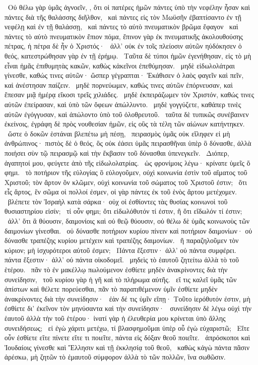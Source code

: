 ~Οὐ θέλω γὰρ ὑμᾶς ἀγνοεῖν, , ὅτι οἱ πατέρες ἡμῶν πάντες ὑπὸ τὴν νεφέλην ἦσαν καὶ πάντες διὰ τῆς θαλάσσης διῆλθον,
~καὶ πάντες εἰς τὸν Μωϋσῆν ἐβαπτίσαντο ἐν τῇ νεφέλῃ καὶ ἐν τῇ θαλάσσῃ,
~καὶ πάντες τὸ αὐτὸ πνευματικὸν βρῶμα ἔφαγον
~καὶ πάντες τὸ αὐτὸ πνευματικὸν ἔπιον πόμα, ἔπινον γὰρ ἐκ πνευματικῆς ἀκολουθούσης πέτρας, ἡ πέτρα δὲ ἦν ὁ Χριστός·
~ἀλλ’ οὐκ ἐν τοῖς πλείοσιν αὐτῶν ηὐδόκησεν ὁ θεός, κατεστρώθησαν γὰρ ἐν τῇ ἐρήμῳ.
~Ταῦτα δὲ τύποι ἡμῶν ἐγενήθησαν, εἰς τὸ μὴ εἶναι ἡμᾶς ἐπιθυμητὰς κακῶν, καθὼς κἀκεῖνοι ἐπεθύμησαν.
~μηδὲ εἰδωλολάτραι γίνεσθε, καθώς τινες αὐτῶν· ὥσπερ γέγραπται· Ἐκάθισεν ὁ λαὸς φαγεῖν καὶ πεῖν, καὶ ἀνέστησαν παίζειν.
~μηδὲ πορνεύωμεν, καθώς τινες αὐτῶν ἐπόρνευσαν, καὶ ἔπεσαν μιᾷ ἡμέρᾳ εἴκοσι τρεῖς χιλιάδες.
~μηδὲ ἐκπειράζωμεν τὸν Χριστόν, καθώς τινες αὐτῶν ἐπείρασαν, καὶ ὑπὸ τῶν ὄφεων ἀπώλλυντο.
~μηδὲ γογγύζετε, καθάπερ τινὲς αὐτῶν ἐγόγγυσαν, καὶ ἀπώλοντο ὑπὸ τοῦ ὀλοθρευτοῦ.
~ταῦτα δὲ τυπικῶς συνέβαινεν ἐκείνοις, ἐγράφη δὲ πρὸς νουθεσίαν ἡμῶν, εἰς οὓς τὰ τέλη τῶν αἰώνων κατήντηκεν.
~ὥστε ὁ δοκῶν ἑστάναι βλεπέτω μὴ πέσῃ,
~πειρασμὸς ὑμᾶς οὐκ εἴληφεν εἰ μὴ ἀνθρώπινος· πιστὸς δὲ ὁ θεός, ὃς οὐκ ἐάσει ὑμᾶς πειρασθῆναι ὑπὲρ ὃ δύνασθε, ἀλλὰ ποιήσει σὺν τῷ πειρασμῷ καὶ τὴν ἔκβασιν τοῦ δύνασθαι ὑπενεγκεῖν.
~Διόπερ, ἀγαπητοί μου, φεύγετε ἀπὸ τῆς εἰδωλολατρίας.
~ὡς φρονίμοις λέγω· κρίνατε ὑμεῖς ὅ φημι.
~τὸ ποτήριον τῆς εὐλογίας ὃ εὐλογοῦμεν, οὐχὶ κοινωνία ἐστὶν τοῦ αἵματος τοῦ Χριστοῦ; τὸν ἄρτον ὃν κλῶμεν, οὐχὶ κοινωνία τοῦ σώματος τοῦ Χριστοῦ ἐστιν;
~ὅτι εἷς ἄρτος, ἓν σῶμα οἱ πολλοί ἐσμεν, οἱ γὰρ πάντες ἐκ τοῦ ἑνὸς ἄρτου μετέχομεν.
~βλέπετε τὸν Ἰσραὴλ κατὰ σάρκα· οὐχ οἱ ἐσθίοντες τὰς θυσίας κοινωνοὶ τοῦ θυσιαστηρίου εἰσίν;
~τί οὖν φημι; ὅτι εἰδωλόθυτόν τί ἐστιν, ἢ ὅτι εἴδωλόν τί ἐστιν;
~ἀλλ’ ὅτι ἃ θύουσιν, δαιμονίοις καὶ οὐ θεῷ θύουσιν, οὐ θέλω δὲ ὑμᾶς κοινωνοὺς τῶν δαιμονίων γίνεσθαι.
~οὐ δύνασθε ποτήριον κυρίου πίνειν καὶ ποτήριον δαιμονίων· οὐ δύνασθε τραπέζης κυρίου μετέχειν καὶ τραπέζης δαιμονίων.
~ἢ παραζηλοῦμεν τὸν κύριον; μὴ ἰσχυρότεροι αὐτοῦ ἐσμεν;
~Πάντα ἔξεστιν· ἀλλ’ οὐ πάντα συμφέρει. πάντα ἔξεστιν· ἀλλ’ οὐ πάντα οἰκοδομεῖ.
~μηδεὶς τὸ ἑαυτοῦ ζητείτω ἀλλὰ τὸ τοῦ ἑτέρου.
~πᾶν τὸ ἐν μακέλλῳ πωλούμενον ἐσθίετε μηδὲν ἀνακρίνοντες διὰ τὴν συνείδησιν,
~τοῦ κυρίου γὰρ ἡ γῆ καὶ τὸ πλήρωμα αὐτῆς.
~εἴ τις καλεῖ ὑμᾶς τῶν ἀπίστων καὶ θέλετε πορεύεσθαι, πᾶν τὸ παρατιθέμενον ὑμῖν ἐσθίετε μηδὲν ἀνακρίνοντες διὰ τὴν συνείδησιν·
~ἐὰν δέ τις ὑμῖν εἴπῃ· Τοῦτο ἱερόθυτόν ἐστιν, μὴ ἐσθίετε δι’ ἐκεῖνον τὸν μηνύσαντα καὶ τὴν συνείδησιν·
~συνείδησιν δὲ λέγω οὐχὶ τὴν ἑαυτοῦ ἀλλὰ τὴν τοῦ ἑτέρου· ἱνατί γὰρ ἡ ἐλευθερία μου κρίνεται ὑπὸ ἄλλης συνειδήσεως;
~εἰ ἐγὼ χάριτι μετέχω, τί βλασφημοῦμαι ὑπὲρ οὗ ἐγὼ εὐχαριστῶ;
~Εἴτε οὖν ἐσθίετε εἴτε πίνετε εἴτε τι ποιεῖτε, πάντα εἰς δόξαν θεοῦ ποιεῖτε.
~ἀπρόσκοποι καὶ Ἰουδαίοις γίνεσθε καὶ Ἕλλησιν καὶ τῇ ἐκκλησίᾳ τοῦ θεοῦ,
~καθὼς κἀγὼ πάντα πᾶσιν ἀρέσκω, μὴ ζητῶν τὸ ἐμαυτοῦ σύμφορον ἀλλὰ τὸ τῶν πολλῶν, ἵνα σωθῶσιν.


